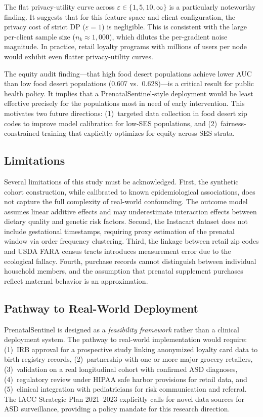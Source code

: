 \documentclass[journal]{IEEEtran}
\newcommand{\eps}{\varepsilon}
\begin{document}
The flat privacy-utility curve across $\eps \in \{1, 5, 10, \infty\}$
is a particularly noteworthy finding. It suggests that for this
feature space and client configuration, the privacy cost of strict
DP ($\eps=1$) is negligible. This is consistent with the large
per-client sample size ($n_k \approx 1{,}000$), which dilutes the
per-gradient noise magnitude. In practice, retail loyalty programs
with millions of users per node would exhibit even flatter
privacy-utility curves.

The equity audit finding---that high food desert populations achieve
lower AUC than low food desert populations (0.607 vs.\ 0.628)---is
a critical result for public health policy. It implies that a
PrenatalSentinel-style deployment would be least effective precisely
for the populations most in need of early intervention. This
motivates two future directions: (1)~targeted data collection in
food desert zip codes to improve model calibration for low-SES
populations, and (2)~fairness-constrained training that explicitly
optimizes for equity across SES strata.

\subsection{Limitations}

Several limitations of this study must be acknowledged. First, the
synthetic cohort construction, while calibrated to known
epidemiological associations, does not capture the full complexity
of real-world confounding. The outcome model assumes linear additive
effects and may underestimate interaction effects between dietary
quality and genetic risk factors. Second, the Instacart dataset does
not include gestational timestamps, requiring proxy estimation of
the prenatal window via order frequency clustering. Third, the
linkage between retail zip codes and USDA FARA census tracts
introduces measurement error due to the ecological fallacy.
Fourth, purchase records cannot distinguish between individual
household members, and the assumption that prenatal supplement
purchases reflect maternal behavior is an approximation.

\subsection{Pathway to Real-World Deployment}

PrenatalSentinel is designed as a \textit{feasibility framework}
rather than a clinical deployment system. The pathway to real-world
implementation would require: (1)~IRB approval for a prospective
study linking anonymized loyalty card data to birth registry records,
(2)~partnership with one or more major grocery retailers, (3)~validation
on a real longitudinal cohort with confirmed ASD diagnoses,
(4)~regulatory review under HIPAA safe harbor provisions for retail
data, and (5)~clinical integration with pediatricians for risk
communication and referral. The IACC Strategic Plan 2021--2023
explicitly calls for novel data sources for ASD surveillance,
providing a policy mandate for this research direction.
\end{document}
